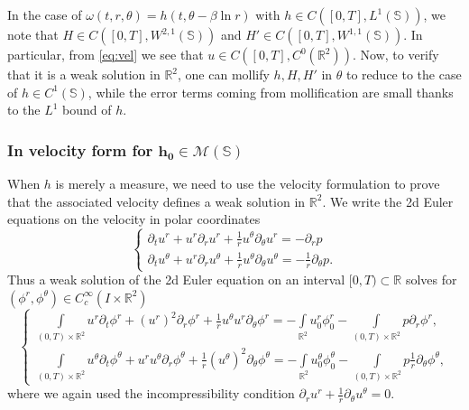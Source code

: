 \documentclass[10pt]{article}
\theoremstyle{definition}
\theoremstyle{remark}
\numberwithin{equation}{section}
\newcommand{\0}{\emptyset}
\newcommand{\omg}{\omega}
\newcommand{\bbR}{\mathbb R}
\newcommand{\bbS}{\mathbb S}
\begin{document}
    In the case of $\omg(t,r,\theta)=h(t,\theta-\beta\ln r)$ with $h \in C\left([0,T], L^{1}(\bbS)\right)$, we note that $H \in  C\left([0,T], W^{2,1}(\bbS)\right)$ and  $H' \in  C\left([0,T], W^{1,1}(\bbS)\right)$. In particular, from \eqref{eq:vel} we see that $u\in  C\left([0,T], C^0(\mathbb{R}^2)\right)$. Now, to verify that it is a weak solution in $\bbR^{2}$, one can mollify $h, H, H'$ in $\theta$ to reduce to the case of $h \in C^1(\bbS)$, while the error terms coming from mollification are small thanks to the $L^1$ bound of $h$. 

    
\subsubsection{In velocity form for $\boldsymbol{h_0\in \mathcal{M}\left(\mathbb{S}\right)}$}

When $h$ is merely a measure, we need to use the velocity formulation to prove that the associated velocity defines a weak solution in $\bbR^2$. We write the 2d Euler equations on the velocity in polar coordinates 
	\[
	\begin{cases}
		\partial_t u^r+u^r\partial_ru^r+\frac{1}{r}u^\theta \partial_\theta u^r=-\partial_r p\\
		\partial_t u^\theta+u^r\partial_ru^\theta+\frac{1}{r}u^\theta \partial_\theta u^\theta=-\frac{1}{r}\partial_\theta p. 
	\end{cases}
	\]
	Thus a weak solution of the 2d Euler equation on an interval $[0,T)\subset \mathbb{R}$ solves for $(\phi^r,\phi^\theta)\in C^{\infty}_c\left(I\times \mathbb{R}^2\right)$
	\begin{equation}\label{eq: weak euler}
	\begin{cases}
		\int\limits_{(0,T)\times\mathbb{R}^2}u^r \partial_t\phi^r+(u^r)^2 \partial_r \phi^r+\frac{1}{r}u^\theta u^r \partial_\theta \phi^r=-\int\limits_{\mathbb{R}^2}u^r_0\phi^r_0-\int\limits_{(0,T)\times\mathbb{R}^2} p \partial_r \phi^r,\\
		\int\limits_{(0,T)\times\mathbb{R}^2}u^\theta \partial_t\phi^\theta+u^r u^\theta \partial_r \phi^\theta+\frac{1}{r}(u^\theta)^2 \partial_\theta \phi^\theta=-\int\limits_{\mathbb{R}^2}u^\theta_0\phi^\theta_0-\int\limits_{(0,T)\times\mathbb{R}^2} p \frac{1}{r}\partial_\theta \phi^\theta,
	\end{cases}
	\end{equation}
	where we again used the incompressibility condition $\partial_r u^r+\frac{1}{r}\partial_\theta u^\theta=0$. 
 
\end{document}
